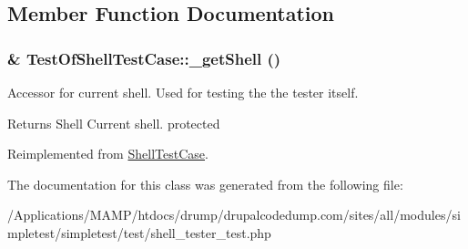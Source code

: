 \subsection{Member Function Documentation}
\hypertarget{class_test_of_shell_test_case_af3aa12f7445154b54aaa645ca973acac}{
\subsubsection[{\_\-getShell}]{\setlength{\rightskip}{0pt plus 5cm}\& TestOfShellTestCase::\_\-getShell ()}}
\label{class_test_of_shell_test_case_af3aa12f7445154b54aaa645ca973acac}
Accessor for current shell. Used for testing the the tester itself. \begin{DoxyReturn}{Returns}
Shell Current shell.  protected 
\end{DoxyReturn}


Reimplemented from \hyperlink{class_shell_test_case_a51aeeea213f51d1f4b17173fd507d782}{ShellTestCase}.

The documentation for this class was generated from the following file:\begin{DoxyCompactItemize}
\item 
/Applications/MAMP/htdocs/drump/drupalcodedump.com/sites/all/modules/simpletest/simpletest/test/shell\_\-tester\_\-test.php\end{DoxyCompactItemize}
